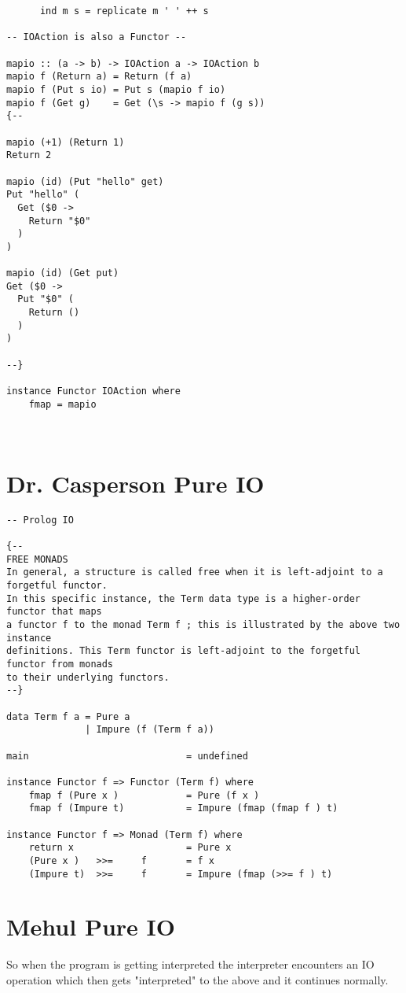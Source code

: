 \documentclass[thesis-solanki.tex]{subfiles}
\begin{document}
\begin{verbatim}
      ind m s = replicate m ' ' ++ s

-- IOAction is also a Functor --

mapio :: (a -> b) -> IOAction a -> IOAction b
mapio f (Return a) = Return (f a)
mapio f (Put s io) = Put s (mapio f io)
mapio f (Get g)    = Get (\s -> mapio f (g s))
{--

mapio (+1) (Return 1)
Return 2

mapio (id) (Put "hello" get)
Put "hello" (
  Get ($0 -> 
    Return "$0"
  )
)

mapio (id) (Get put)
Get ($0 -> 
  Put "$0" (
    Return ()
  )
)

--}

instance Functor IOAction where
    fmap = mapio



\end{verbatim}

\section{Dr. Casperson Pure IO}
\begin{verbatim}
-- Prolog IO

{--
FREE MONADS
In general, a structure is called free when it is left-adjoint to a forgetful functor.
In this specific instance, the Term data type is a higher-order functor that maps
a functor f to the monad Term f ; this is illustrated by the above two instance
definitions. This Term functor is left-adjoint to the forgetful functor from monads
to their underlying functors.
--}

data Term f a = Pure a 
			  | Impure (f (Term f a))

main 							= undefined

instance Functor f => Functor (Term f) where
	fmap f (Pure x ) 			= Pure (f x )
	fmap f (Impure t) 			= Impure (fmap (fmap f ) t)

instance Functor f => Monad (Term f) where
	return x 					= Pure x
	(Pure x ) 	>>= 	f 		= f x
	(Impure t) 	>>= 	f 		= Impure (fmap (>>= f ) t)

\end{verbatim}

\section{Mehul Pure IO}

So when the program is getting interpreted the interpreter encounters an IO operation which then gets "interpreted" to the above and it 
continues normally.
\end{document}
